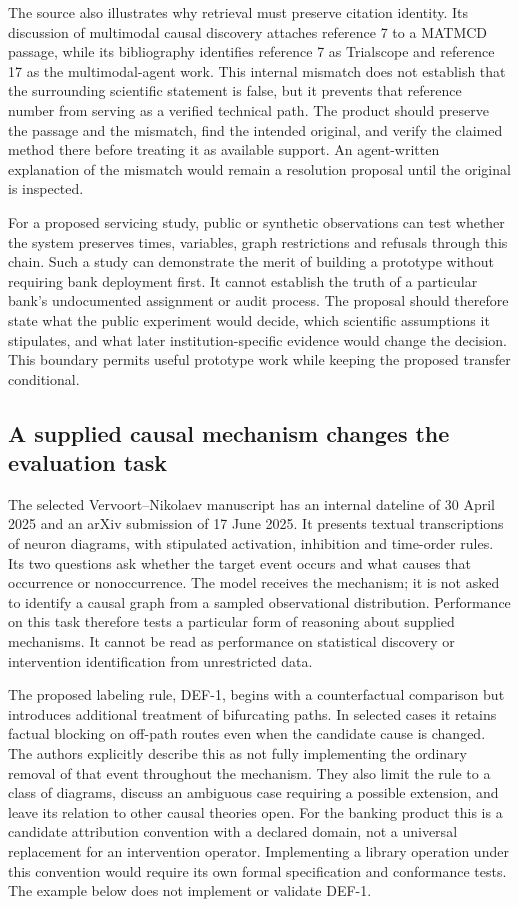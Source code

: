 The source also illustrates why retrieval must preserve citation identity.
Its discussion of multimodal causal discovery attaches reference 7 to a
MATMCD passage, while its bibliography identifies reference 7 as Trialscope
and reference 17 as the multimodal-agent work. This internal mismatch does
not establish that the surrounding scientific statement is false, but it
prevents that reference number from serving as a verified technical path.
The product should preserve the passage and the mismatch, find the intended
original, and verify the claimed method there before treating it as available
support. An agent-written explanation of the mismatch would remain a
resolution proposal until the original is inspected.\citep{exec18_reasoning_biomedical}

For a proposed servicing study, public or synthetic observations can test
whether the system preserves times, variables, graph restrictions and refusals
through this chain. Such a study can demonstrate the merit of building a
prototype without requiring bank deployment first. It cannot establish the
truth of a particular bank's undocumented assignment or audit process. The
proposal should therefore state what the public experiment would decide,
which scientific assumptions it stipulates, and what later institution-specific
evidence would change the decision. This boundary permits useful prototype
work while keeping the proposed transfer conditional.

\subsection{A supplied causal mechanism changes the evaluation task}
The selected Vervoort--Nikolaev manuscript has an internal dateline of
30 April 2025 and an arXiv submission of 17 June 2025. It presents textual
transcriptions of neuron diagrams, with stipulated activation, inhibition
and time-order rules. Its two questions ask whether the target event occurs
and what causes that occurrence or nonoccurrence. The model receives the
mechanism; it is not asked to identify a causal graph from a sampled
observational distribution. Performance on this task therefore tests a
particular form of reasoning about supplied mechanisms. It cannot be read as
performance on statistical discovery or intervention identification from
unrestricted data.\citep{exec18_reasoning_neuron}

The proposed labeling rule, DEF-1, begins with a counterfactual comparison
but introduces additional treatment of bifurcating paths. In selected cases it
retains factual blocking on off-path routes even when the candidate cause is
changed. The authors explicitly describe this as not fully implementing the
ordinary removal of that event throughout the mechanism. They also limit
the rule to a class of diagrams, discuss an ambiguous case requiring a
possible extension, and leave its relation to other causal theories open.
For the banking product this is a candidate attribution convention with a
declared domain, not a universal replacement for an intervention operator.
Implementing a library operation under this convention would require its
own formal specification and conformance tests. The example below does not
implement or validate DEF-1.\citep{exec18_reasoning_neuron}

